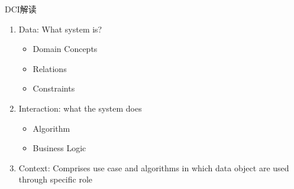 \begin{frame}{DCI解读}
    \begin{enumerate}
    \item \alert{Data}: What system is?
          \begin{itemize}
          \item Domain Concepts
          \item Relations 
          \item Constraints
          \end{itemize}
    \item \alert{Interaction}: what the system does 
          \begin{itemize}
          \item Algorithm
          \item Business Logic 
          \end{itemize}
    \item \alert{Context}: Comprises \alert{use case} and \alert{algorithms} in which \alert{data object} are used through specific \alert{role}
    \end{enumerate}
\end{frame}
